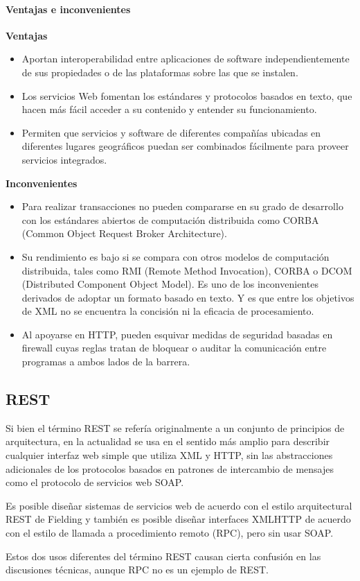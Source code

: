\paragraph{Ventajas e inconvenientes}

\textbf{Ventajas}
\begin{itemize}
\item Aportan interoperabilidad entre aplicaciones de software independientemente de sus propiedades o de las plataformas sobre las que se instalen.
\item Los servicios Web fomentan los estándares y protocolos basados en texto, que hacen más fácil acceder a su contenido y entender su funcionamiento.
\item Permiten que servicios y software de diferentes compañías ubicadas en diferentes lugares geográficos puedan ser combinados fácilmente para proveer servicios integrados.
\end{itemize}


\textbf{Inconvenientes}
\begin{itemize}
\item Para realizar transacciones no pueden compararse en su grado de desarrollo con los estándares abiertos de computación distribuida como CORBA (Common Object Request Broker Architecture).
\item Su rendimiento es bajo si se compara con otros modelos de computación distribuida, tales como RMI (Remote Method Invocation), CORBA o DCOM (Distributed Component Object Model). Es uno de los inconvenientes derivados de adoptar un formato basado en texto. Y es que entre los objetivos de XML no se encuentra la concisión ni la eficacia de procesamiento.
\item Al apoyarse en HTTP, pueden esquivar medidas de seguridad basadas en firewall cuyas reglas tratan de bloquear o auditar la comunicación entre programas a ambos lados de la barrera.
\end{itemize}

\subsection{REST}
\begin{defn}[REST]
Si bien el término REST se refería originalmente a un conjunto de principios de arquitectura, en la actualidad se usa en el sentido más amplio para describir cualquier interfaz web simple que utiliza XML y HTTP, sin las abstracciones adicionales de los protocolos basados en patrones de intercambio de mensajes como el protocolo de servicios web SOAP.

Es posible diseñar sistemas de servicios web de acuerdo con el estilo arquitectural REST de Fielding y también es posible diseñar interfaces XMLHTTP de acuerdo con el estilo de llamada a procedimiento remoto (RPC), pero sin usar SOAP.

Estos dos usos diferentes del término REST causan cierta confusión en las discusiones técnicas, aunque RPC no es un ejemplo de REST.
\end{defn}

